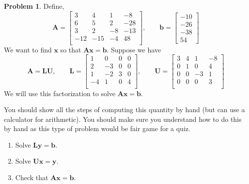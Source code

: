 \documentclass[12pt]{article}
\theoremstyle{definition}
\newtheorem{problem}{Problem}
\renewcommand{\vec}{\mathbf}
\begin{document}
\begin{problem}

    Define,
    \begin{equation*}
        \vec{A} =
        \begin{bmatrix}
         3 & 4 & 1 & -8 \\
         6 & 5 & 2 & -28 \\
         3 & 2 & -8 & -13 \\
         -12 & -15 & -4 & 48 \\
        \end{bmatrix}
        ,\qquad
        \vec{b} = 
        \begin{bmatrix}-10\\-26\\-38\\54\end{bmatrix}
        \end{equation*}
        We want to find $\vec{x}$ so that $\vec{A}\vec{x} = \vec{b}$.
        Suppose we have
        \[
            \vec{A} = \vec{L}\vec{U},\qquad
        \vec{L} = 
        \begin{bmatrix}
     1 & 0 & 0 & 0 \\
     2 & -3 & 0 & 0 \\
     1 & -2 & 3 & 0 \\
     -4 & 1 & 0 & 4 \\
        \end{bmatrix}
        ,\qquad
        \vec{U} = 
        \begin{bmatrix}
     3 & 4 & 1 & -8 \\
     0 & 1 & 0 & 4 \\
     0 & 0 & -3 & 1 \\
     0 & 0 & 0 & 3 \\
        \end{bmatrix}
        \]
        We will use this factorization to solve $\vec{A} \vec{x} = \vec{b}$.

        You should show all the steps of computing this quantity by hand (but can use a calculator for arithmetic). You should make sure you understand how to do this by hand as this type of problem would be fair game for a quiz.

        \begin{enumerate}
        \item Solve $\vec{L}\vec{y} = \vec{b}$.
        \item Solve $\vec{U}\vec{x} = \vec{y}$.
        \item Check that $\vec{A}\vec{x} = \vec{b}$.
        \end{enumerate}
    
    \end{problem}
    
\end{document}
